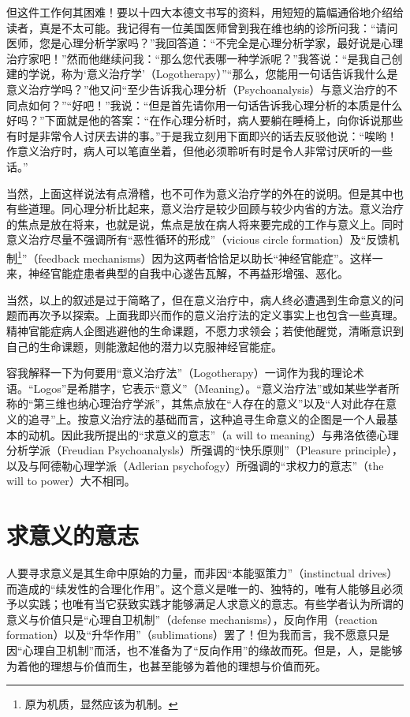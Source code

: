 \documentclass[11pt,oneside]{book}
\begin{document}
\begin{common-format}
但这件工作何其困难！要以十四大本德文书写的资料，用短短的篇幅通俗地介绍给读者，真是不太可能。我记得有一位美国医师曾到我在维也纳的诊所问我：“请问医师，您是心理分析学家吗？”我回答道：“不完全是心理分析学家，最好说是心理治疗家吧！”然而他继续问我：“那么您代表哪一种学派呢？”我答说：“是我自己创建的学说，称为‘意义治疗学’（Logotherapy）”“那么，您能用一句话告诉我什么是意义治疗学吗？”他又问“至少告诉我心理分析（Psychoanalysis）与意义治疗的不同点如何？”“好吧！”我说：“但是首先请你用一句话告诉我心理分析的本质是什么好吗？”下面就是他的答案：“在作心理分析时，病人要躺在睡椅上，向你诉说那些有时是非常令人讨厌去讲的事。”于是我立刻用下面即兴的话去反驳他说：“唉哟！作意义治疗时，病人可以笔直坐着，但他必须聆听有时是令人非常讨厌听的一些话。”

当然，上面这样说法有点滑稽，也不可作为意义治疗学的外在的说明。但是其中也有些道理。同心理分析比起来，意义治疗是较少回顾与较少内省的方法。意义治疗的焦点是放在将来，也就是说，焦点是放在病人将来要完成的工作与意义上。同时意义治疗尽量不强调所有“恶性循环的形成”（vicious circle formation）及“反馈机制\footnote{原为机质，显然应该为机制。}”（feedback mechanisms）因为这两者恰恰足以助长“神经官能症”。这样一来，神经官能症患者典型的自我中心遂告瓦解，不再益形增强、恶化。

当然，以上的叙述是过于简略了，但在意义治疗中，病人终必遭遇到生命意义的问题而再次予以探索。上面我即兴而作的意义治疗法的定义事实上也包含一些真理。精神官能症病人企图逃避他的生命课题，不愿力求领会；若使他醒觉，清晰意识到自己的生命课题，则能激起他的潜力以克服神经官能症。

容我解释一下为何要用“意义治疗法”（Logotherapy）一词作为我的理论术语。“Logos”是希腊字，它表示“意义”（Meaning）。“意义治疗法”或如某些学者所称的“第三维也纳心理治疗学派”，其焦点放在“人存在的意义”以及“人对此存在意义的追寻”上。按意义治疗法的基础而言，这种追寻生命意义的企图是一个人最基本的动机。因此我所提出的“求意义的意志”（a will to meaning）与弗洛依德心理分析学派（Freudian Psychoanalysls）所强调的“快乐原则”（Pleasure principle），以及与阿德勒心理学派（Adlerian psychofogy）所强调的“求权力的意志”（the will to power）大不相同。


\section{求意义的意志}
人要寻求意义是其生命中原始的力量，而非因“本能驱策力”（instinctual drives）而造成的“续发性的合理化作用”。这个意义是唯一的、独特的，唯有人能够且必须予以实践；也唯有当它获致实践才能够满足人求意义的意志。有些学者认为所谓的意义与价值只是“心理自卫机制”（defense mechanisms），反向作用（reaction formation）以及“升华作用”（sublimations）罢了！但为我而言，我不愿意只是因“心理自卫机制”而活，也不准备为了“反向作用”的缘故而死。但是，人，是能够为着他的理想与价值而生，也甚至能够为着他的理想与价值而死。


\end{common-format}
\end{document}
